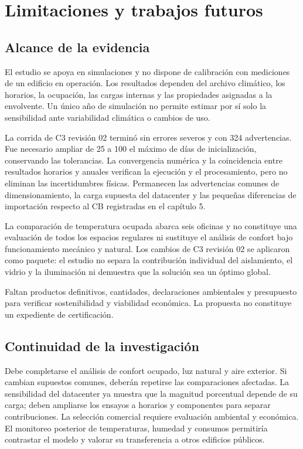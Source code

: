 \par\medskip
\section{Limitaciones y trabajos futuros}
\subsection{Alcance de la evidencia}
\begin{textoDosTercios}
El estudio se apoya en simulaciones y no dispone de calibración con mediciones de un edificio en operación. Los resultados dependen del archivo climático, los horarios, la ocupación, las cargas internas y las propiedades asignadas a la envolvente. Un único año de simulación no permite estimar por sí solo la sensibilidad ante variabilidad climática o cambios de uso.

La corrida de C3 revisión 02 terminó sin errores severos y con 324 advertencias. Fue necesario ampliar de 25 a 100 el máximo de días de inicialización, conservando las tolerancias. La convergencia numérica y la coincidencia entre resultados horarios y anuales verifican la ejecución y el procesamiento, pero no eliminan las incertidumbres físicas. Permanecen las advertencias comunes de dimensionamiento, la carga supuesta del datacenter y las pequeñas diferencias de importación respecto al CB registradas en el capítulo 5.

La comparación de temperatura ocupada abarca seis oficinas y no constituye una evaluación de todos los espacios regulares ni sustituye el análisis de confort bajo funcionamiento mecánico y natural. Los cambios de C3 revisión 02 se aplicaron como paquete: el estudio no separa la contribución individual del aislamiento, el vidrio y la iluminación ni demuestra que la solución sea un óptimo global.

Faltan productos definitivos, cantidades, declaraciones ambientales y presupuesto para verificar sostenibilidad y viabilidad económica. La propuesta no constituye un expediente de certificación.
\end{textoDosTercios}

\subsection{Continuidad de la investigación}
\begin{textoDosTercios}
Debe completarse el análisis de confort ocupado, luz natural y aire exterior. Si cambian supuestos comunes, deberán repetirse las comparaciones afectadas. La sensibilidad del datacenter ya muestra que la magnitud porcentual depende de su carga; deben ampliarse los ensayos a horarios y componentes para separar contribuciones. La selección comercial requiere evaluación ambiental y económica. El monitoreo posterior de temperaturas, humedad y consumos permitiría contrastar el modelo y valorar su transferencia a otros edificios públicos.
\end{textoDosTercios}
